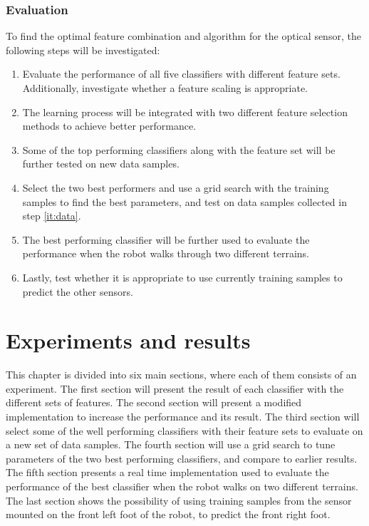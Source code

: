 \documentclass[USenglish]{ifimaster}  %
\begin{document}
\clearpage
\subsection{Evaluation}
To find the optimal feature combination and algorithm for the optical sensor, the following steps will be investigated:

\begin{enumerate}
	\item Evaluate the performance of all five classifiers with different feature sets. Additionally, investigate whether a feature scaling is appropriate.  
	\item The learning process will be integrated with two different feature selection methods to achieve better performance. 
	\item \label{it:data} Some of the top performing classifiers along with the feature set will be further tested on new data samples.
	\item Select the two best performers and use a grid search with the training samples to find the best parameters, and test on data samples collected in step \ref{it:data}.
	\item The best performing classifier will be further used to evaluate the performance when the robot walks through two different terrains.
	\item Lastly, test whether it is appropriate to use currently training samples to predict the other sensors. 
\end{enumerate}


\chapter{Experiments and results}                     %
This chapter is divided into six main sections, where each of them consists of an experiment. The first section will present the result of each classifier with the different sets of features. The second section will present a modified implementation to increase the performance and its result. The third section will select some of the well performing classifiers with their feature sets to evaluate on a new set of data samples. The fourth section will use a grid search to tune parameters of the two best performing classifiers, and compare to earlier results. The fifth section presents a real time implementation used to evaluate the performance of the best classifier when the robot walks on two different terrains. The last section shows the possibility of using training samples from the sensor mounted on the front left foot of the robot, to predict the front right foot.
 
\end{document}
